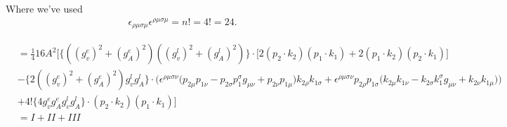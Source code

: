 \documentclass[11pt]{article}
\begin{document}
\begin{center}
Where we've used
\begin{align*}
\epsilon_{\rho \mu \sigma \mu} \epsilon^{\rho \mu \sigma \mu} = n! = 4! = 24. 
\end{align*}
\end{center}
\begin{align*}
&= \frac{1}{4} 16 A^2 \Big[
 \{((g_v^e)^2 + (g_A^e)^2)  ((g_v^l)^2 + (g_A^l)^2)\} \cdot
\Big[ 2(p_2 \cdot k_2) (p_1 \cdot k_1) + 2(p_1 \cdot k_2) (p_2 \cdot k_1) \Big]\\
 &-
\{2 ((g_v^e)^2 + (g_A^e)^2) g_v^l g_A^l \} \cdot
\Big( \epsilon^{\rho \mu \sigma \nu}  \big(
p_{2\mu} p_{1 \nu} - p_{2\sigma} p_1^{ \sigma} g_{\mu\nu}
+ p_{2\nu} p_{1 \mu} \big) k_{2 \rho} k_{1 \sigma} 
+ \epsilon^{\rho \mu \sigma \nu} p_{2 \rho}  p_{1 \sigma}  \big(k_{2 \mu} k_{1 \nu}  - k_{2 \sigma} k_1^{ \sigma} g_{\mu \nu} + k_{2 \nu} k_{1 \mu}\big) \Big)\\
& +
4! \{4  g_v^e g_A^e g_v^l g_A^l  \} \cdot
(p_2 \cdot k_2) (p_1 \cdot k_1)
\Big]\\
&= I + II + III
\end{align*}
\end{document}
